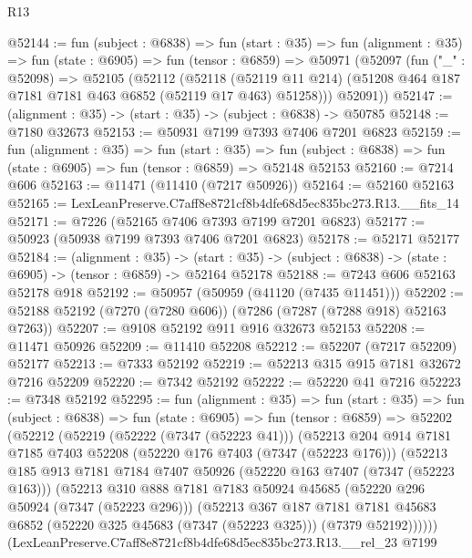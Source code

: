 \begin{lexlean}{R13}
\begin{coremodule}
@52144 := fun (subject : @6838) =>
  fun (start : @35) =>
  fun (alignment : @35) =>
  fun (state : @6905) =>
  fun (tensor : @6859) =>
  @50971
    (@52097
      (fun ("_" : @52098) =>
      @52105
        (@52112
          (@52118
            (@52119 @11 @214)
            (@51208 @464 @187 @7181 @7181 @463 @6852 (@52119 @17 @463) @51258)))
        @52091))
@52147 := (alignment : @35) -> (start : @35) -> (subject : @6838) -> @50785
@52148 := @7180 @32673
@52153 := @50931 @7199 @7393 @7406 @7201 @6823
@52159 := fun (alignment : @35) =>
  fun (start : @35) =>
  fun (subject : @6838) => fun (state : @6905) => fun (tensor : @6859) => @52148 @52153
@52160 := @7214 @606
@52163 := @11471 (@11410 (@7217 @50926))
@52164 := @52160 @52163
@52165 := LexLeanPreserve.C7aff8e8721cf8b4dfe68d5ec835bc273.R13.__fits_14
@52171 := @7226 (@52165 @7406 @7393 @7199 @7201 @6823)
@52177 := @50923 (@50938 @7199 @7393 @7406 @7201 @6823)
@52178 := @52171 @52177
@52184 := (alignment : @35) ->
  (start : @35) -> (subject : @6838) -> (state : @6905) -> (tensor : @6859) -> @52164 @52178
@52188 := @7243 @606 @52163 @52178 @918
@52192 := @50957 (@50959 (@41120 (@7435 @11451)))
@52202 := @52188 @52192 (@7270 (@7280 @606)) (@7286 (@7287 (@7288 @918) @52163 @7263))
@52207 := @9108 @52192 @911 @916 @32673 @52153
@52208 := @11471 @50926
@52209 := @11410 @52208
@52212 := @52207 (@7217 @52209) @52177
@52213 := @7333 @52192
@52219 := @52213 @315 @915 @7181 @32672 @7216 @52209
@52220 := @7342 @52192
@52222 := @52220 @41 @7216
@52223 := @7348 @52192
@52295 := fun (alignment : @35) =>
  fun (start : @35) =>
  fun (subject : @6838) =>
  fun (state : @6905) =>
  fun (tensor : @6859) =>
  @52202
    (@52212
      (@52219
        (@52222 (@7347 (@52223 @41)))
        (@52213
          @204
          @914
          @7181
          @7185
          @7403
          @52208
          (@52220 @176 @7403 (@7347 (@52223 @176)))
          (@52213
            @185
            @913
            @7181
            @7184
            @7407
            @50926
            (@52220 @163 @7407 (@7347 (@52223 @163)))
            (@52213
              @310
              @888
              @7181
              @7183
              @50924
              @45685
              (@52220 @296 @50924 (@7347 (@52223 @296)))
              (@52213
                @367
                @187
                @7181
                @7181
                @45683
                @6852
                (@52220 @325 @45683 (@7347 (@52223 @325)))
                (@7379 @52192))))))
      (LexLeanPreserve.C7aff8e8721cf8b4dfe68d5ec835bc273.R13.__rel_23
        @7199

\end{coremodule}
\end{lexlean}
